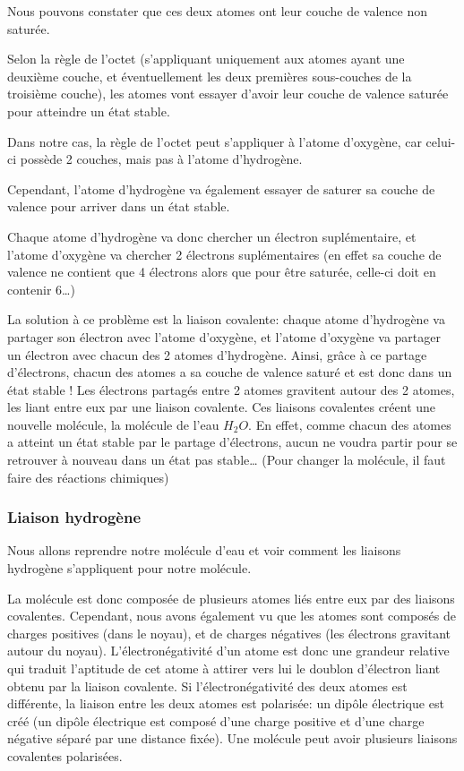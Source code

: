 \documentclass[
]{report}
\begin{document}
Nous pouvons constater que ces deux atomes ont leur couche de valence
non saturée.

Selon la règle de l'octet (s'appliquant uniquement aux atomes ayant une
deuxième couche, et éventuellement les deux premières sous-couches de la
troisième couche), les atomes vont essayer d'avoir leur couche de
valence saturée pour atteindre un état stable.

Dans notre cas, la règle de l'octet peut s'appliquer à l'atome
d'oxygène, car celui-ci possède 2 couches, mais pas à l'atome
d'hydrogène.

Cependant, l'atome d'hydrogène va également essayer de saturer sa couche
de valence pour arriver dans un état stable.

Chaque atome d'hydrogène va donc chercher un électron suplémentaire, et
l'atome d'oxygène va chercher 2 électrons suplémentaires (en effet sa
couche de valence ne contient que 4 électrons alors que pour être
saturée, celle-ci doit en contenir 6\ldots)

La solution à ce problème est la liaison covalente: chaque atome
d'hydrogène va partager son électron avec l'atome d'oxygène, et l'atome
d'oxygène va partager un électron avec chacun des 2 atomes d'hydrogène.
Ainsi, grâce à ce partage d'électrons, chacun des atomes a sa couche de
valence saturé et est donc dans un état stable ! Les électrons partagés
entre 2 atomes gravitent autour des 2 atomes, les liant entre eux par
une liaison covalente. Ces liaisons covalentes créent une nouvelle
molécule, la molécule de l'eau \(H_{2}O\). En effet, comme chacun des
atomes a atteint un état stable par le partage d'électrons, aucun ne
voudra partir pour se retrouver à nouveau dans un état pas
stable\ldots{} (Pour changer la molécule, il faut faire des réactions
chimiques)

\subsubsection{Liaison hydrogène}\label{liaison-hydroguxe8ne}

Nous allons reprendre notre molécule d'eau et voir comment les liaisons
hydrogène s'appliquent pour notre molécule.

La molécule est donc composée de plusieurs atomes liés entre eux par des
liaisons covalentes. Cependant, nous avons également vu que les atomes
sont composés de charges positives (dans le noyau), et de charges
négatives (les électrons gravitant autour du noyau). L'électronégativité
d'un atome est donc une grandeur relative qui traduit l'aptitude de cet
atome à attirer vers lui le doublon d'électron liant obtenu par la
liaison covalente. Si l'électronégativité des deux atomes est
différente, la liaison entre les deux atomes est polarisée: un dipôle
électrique est créé (un dipôle électrique est composé d'une charge
positive et d'une charge négative séparé par une distance fixée). Une
molécule peut avoir plusieurs liaisons covalentes polarisées.
\end{document}
